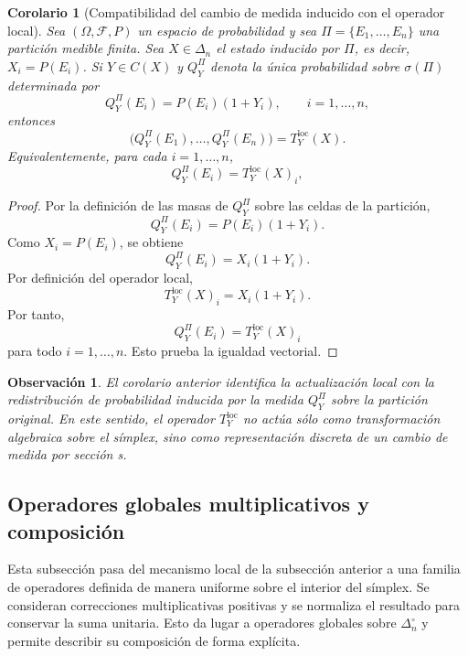 \documentclass[12pt]{article}
\newtheorem{corolario}{Corolario}[section]
\newtheorem{observacion}{Observación}[section]
\begin{document}
\begin{corolario}[Compatibilidad del cambio de medida inducido con el operador local]
\label{cor:compatibilidadCambioMedida}
Sea $(\Omega,\mathcal F,P)$ un espacio de probabilidad y sea
$\Pi=\{E_1,\dots,E_n\}$ una partición medible finita. Sea
$X\in\Delta_n$ el estado inducido por $\Pi$, es decir,
$X_i=P(E_i)$. Si $Y\in C(X)$ y $Q_Y^\Pi$ denota la única probabilidad
sobre $\sigma(\Pi)$ determinada por
\[
Q_Y^\Pi(E_i)=P(E_i)(1+Y_i),
\qquad i=1,\dots,n,
\]
entonces
\[
\bigl(Q_Y^\Pi(E_1),\dots,Q_Y^\Pi(E_n)\bigr)
=
T_Y^{\mathrm{loc}}(X).
\]
Equivalentemente, para cada $i=1,\dots,n$,
\[
Q_Y^\Pi(E_i)=T_Y^{\mathrm{loc}}(X)_i,
\]
\end{corolario}

\begin{proof}
Por la definición de las masas de $Q_Y^\Pi$ sobre las celdas de la partición,
\[
Q_Y^\Pi(E_i)=P(E_i)(1+Y_i).
\]
Como $X_i=P(E_i)$, se obtiene
\[
Q_Y^\Pi(E_i)=X_i(1+Y_i).
\]
Por definición del operador local,
\[
T_Y^{\mathrm{loc}}(X)_i=X_i(1+Y_i).
\]
Por tanto,
\[
Q_Y^\Pi(E_i)=T_Y^{\mathrm{loc}}(X)_i
\]
para todo $i=1,\dots,n$. Esto prueba la igualdad vectorial.
\end{proof}

\begin{observacion}
El corolario anterior identifica la actualización local con la redistribución de probabilidad inducida por la medida $Q_Y^\Pi$ sobre la partición original. En este sentido, el operador $T_Y^{\mathrm{loc}}$ no actúa sólo como transformación algebraica sobre el símplex, sino como representación discreta de un cambio de medida por sección s.
\end{observacion}
\subsection{Operadores globales multiplicativos y composición}

Esta subsección pasa del mecanismo local de la subsección anterior a una familia de operadores definida de manera uniforme sobre el interior del símplex. Se consideran correcciones multiplicativas positivas y se normaliza el resultado para conservar la suma unitaria. Esto da lugar a operadores globales sobre $\Delta_n^\circ$ y permite describir su composición de forma explícita.
\end{document}
